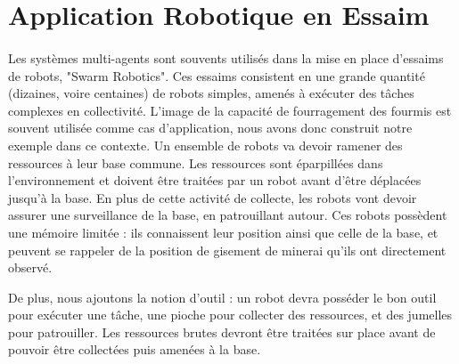 	\section{Application Robotique en Essaim}
	
		\paragraph{}
			Les systèmes multi-agents sont souvents utilisés dans la mise en place d'essaims de robots, "Swarm Robotics". Ces essaims consistent en une grande quantité (dizaines, voire centaines) de robots simples, amenés à exécuter des tâches complexes en collectivité. L'image de la capacité de fourragement des fourmis est souvent utilisée comme cas d'application, nous avons donc construit notre exemple dans ce contexte. Un ensemble de robots va devoir ramener des ressources à leur base commune. Les ressources sont éparpillées dans l'environnement et doivent être traitées par un robot avant d'être déplacées jusqu'à la base. En plus de cette activité de collecte, les robots vont devoir assurer une surveillance de la base, en patrouillant autour. Ces robots possèdent une mémoire limitée : ils connaissent leur position ainsi que celle de la base, et peuvent se rappeler de la position de gisement de minerai qu'ils ont directement observé.
			
		De plus, nous ajoutons la notion d'outil : un robot devra posséder le bon outil pour exécuter une tâche, une pioche pour collecter des ressources, et des jumelles pour patrouiller. Les ressources brutes devront être traitées sur place avant de pouvoir être collectées puis amenées à la base.

